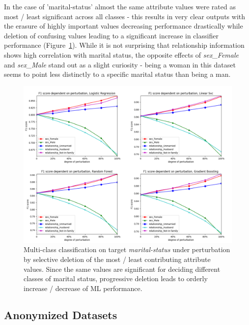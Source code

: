\documentclass{llncs}
\begin{document}
In the case of 'marital-status' almost the same attribute values were rated as most / least significant across all classes - this results in very clear outputs with the erasure of highly important values decreasing performance drastically while deletion of confusing values leading to a significant increase in classifier performance (Figure~\ref{fig:results_perturbation_marital_status}). While it is not surprising that relationship information shows high correlation with marital status, the opposite effects of \textit{sex\_Female} and \textit{sex\_Male} stand out as a slight curiosity - being a woman in this dataset seems to point less distinctly to a specific marital status than being a man.


\begin{figure}[h]
	\centering
	\includegraphics[width=1\textwidth]{figures/perturbation/adults_marital_status/perturb_marital_combined}
	\caption{Multi-class classification on target \textit{marital-status} under perturbation by selective deletion of the most / least contributing attribute values. Since the same values are significant for deciding different classes of marital status, progressive deletion leads to orderly increase / decrease of ML performance.}
	\label{fig:results_perturbation_marital_status}
\end{figure}



\subsection{Anonymized Datasets}
\label{ssect:anonymized_ds}
\end{document}
